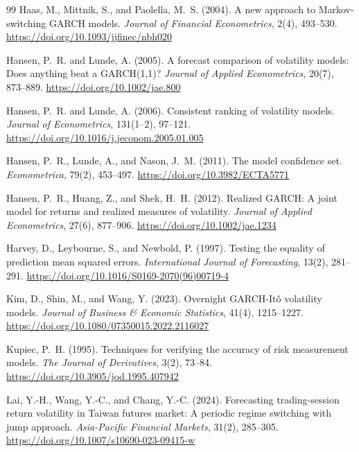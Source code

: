 \documentclass[11pt,a4paper]{article}
\begin{document}
\begin{thebibliography}{99}
Haas, M., Mittnik, S., and Paolella, M.~S. (2004).
\newblock A new approach to Markov-switching GARCH models.
\newblock \emph{Journal of Financial Econometrics}, 2(4), 493--530.
\newblock \url{https://doi.org/10.1093/jjfinec/nbh020}

Hansen, P.~R. and Lunde, A. (2005).
\newblock A forecast comparison of volatility models: Does anything beat a GARCH(1,1)?
\newblock \emph{Journal of Applied Econometrics}, 20(7), 873--889.
\newblock \url{https://doi.org/10.1002/jae.800}

Hansen, P.~R. and Lunde, A. (2006).
\newblock Consistent ranking of volatility models.
\newblock \emph{Journal of Econometrics}, 131(1--2), 97--121.
\newblock \url{https://doi.org/10.1016/j.jeconom.2005.01.005}

Hansen, P.~R., Lunde, A., and Nason, J.~M. (2011).
\newblock The model confidence set.
\newblock \emph{Econometrica}, 79(2), 453--497.
\newblock \url{https://doi.org/10.3982/ECTA5771}

Hansen, P.~R., Huang, Z., and Shek, H.~H. (2012).
\newblock Realized GARCH: A joint model for returns and realized measures of volatility.
\newblock \emph{Journal of Applied Econometrics}, 27(6), 877--906.
\newblock \url{https://doi.org/10.1002/jae.1234}

Harvey, D., Leybourne, S., and Newbold, P. (1997).
\newblock Testing the equality of prediction mean squared errors.
\newblock \emph{International Journal of Forecasting}, 13(2), 281--291.
\newblock \url{https://doi.org/10.1016/S0169-2070(96)00719-4}

Kim, D., Shin, M., and Wang, Y. (2023).
\newblock Overnight GARCH-It\^{o} volatility models.
\newblock \emph{Journal of Business \& Economic Statistics}, 41(4), 1215--1227.
\newblock \url{https://doi.org/10.1080/07350015.2022.2116027}

Kupiec, P.~H. (1995).
\newblock Techniques for verifying the accuracy of risk measurement models.
\newblock \emph{The Journal of Derivatives}, 3(2), 73--84.
\newblock \url{https://doi.org/10.3905/jod.1995.407942}

Lai, Y.-H., Wang, Y.-C., and Chang, Y.-C. (2024).
\newblock Forecasting trading-session return volatility in Taiwan futures market:
A periodic regime switching with jump approach.
\newblock \emph{Asia-Pacific Financial Markets}, 31(2), 285--305.
\newblock \url{https://doi.org/10.1007/s10690-023-09415-w}


\end{thebibliography}
\end{document}
